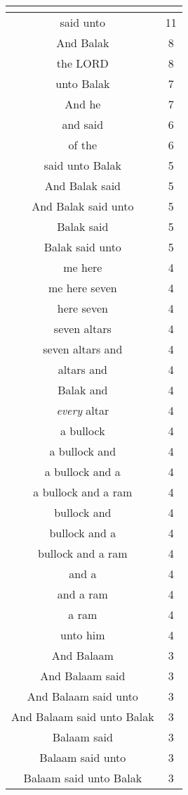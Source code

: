 \begin{center}
\begin{longtable}{|c|c|}
\hline \multicolumn{2}{c}{{ }} \\ \hline
\endfoot 
said unto & 11\\ \hline 
And Balak & 8\\ \hline 
the LORD & 8\\ \hline 
unto Balak & 7\\ \hline 
And he & 7\\ \hline 
and said & 6\\ \hline 
of the & 6\\ \hline 
said unto Balak & 5\\ \hline 
And Balak said & 5\\ \hline 
And Balak said unto & 5\\ \hline 
Balak said & 5\\ \hline 
Balak said unto & 5\\ \hline 
me here & 4\\ \hline 
me here seven & 4\\ \hline 
here seven & 4\\ \hline 
seven altars & 4\\ \hline 
seven altars and & 4\\ \hline 
altars and & 4\\ \hline 
Balak and & 4\\ \hline 
\emph{every} altar & 4\\ \hline 
a bullock & 4\\ \hline 
a bullock and & 4\\ \hline 
a bullock and a & 4\\ \hline 
a bullock and a ram & 4\\ \hline 
bullock and & 4\\ \hline 
bullock and a & 4\\ \hline 
bullock and a ram & 4\\ \hline 
and a & 4\\ \hline 
and a ram & 4\\ \hline 
a ram & 4\\ \hline 
unto him & 4\\ \hline 
And Balaam & 3\\ \hline 
And Balaam said & 3\\ \hline 
And Balaam said unto & 3\\ \hline 
And Balaam said unto Balak & 3\\ \hline 
Balaam said & 3\\ \hline 
Balaam said unto & 3\\ \hline 
Balaam said unto Balak & 3\\ \hline 

\end{longtable}
\end{center}
